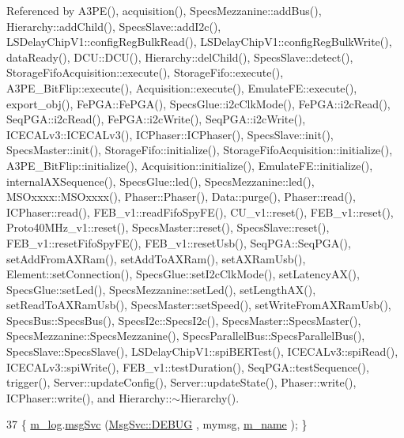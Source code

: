 Referenced by A3\+P\+E(), acquisition(), Specs\+Mezzanine\+::add\+Bus(), Hierarchy\+::add\+Child(), Specs\+Slave\+::add\+I2c(), L\+S\+Delay\+Chip\+V1\+::config\+Reg\+Bulk\+Read(), L\+S\+Delay\+Chip\+V1\+::config\+Reg\+Bulk\+Write(), data\+Ready(), D\+C\+U\+::\+D\+C\+U(), Hierarchy\+::del\+Child(), Specs\+Slave\+::detect(), Storage\+Fifo\+Acquisition\+::execute(), Storage\+Fifo\+::execute(), A3\+P\+E\+\_\+\+Bit\+Flip\+::execute(), Acquisition\+::execute(), Emulate\+F\+E\+::execute(), export\+\_\+obj(), Fe\+P\+G\+A\+::\+Fe\+P\+G\+A(), Specs\+Glue\+::i2c\+Clk\+Mode(), Fe\+P\+G\+A\+::i2c\+Read(), Seq\+P\+G\+A\+::i2c\+Read(), Fe\+P\+G\+A\+::i2c\+Write(), Seq\+P\+G\+A\+::i2c\+Write(), I\+C\+E\+C\+A\+Lv3\+::\+I\+C\+E\+C\+A\+Lv3(), I\+C\+Phaser\+::\+I\+C\+Phaser(), Specs\+Slave\+::init(), Specs\+Master\+::init(), Storage\+Fifo\+::initialize(), Storage\+Fifo\+Acquisition\+::initialize(), A3\+P\+E\+\_\+\+Bit\+Flip\+::initialize(), Acquisition\+::initialize(), Emulate\+F\+E\+::initialize(), internal\+A\+X\+Sequence(), Specs\+Glue\+::led(), Specs\+Mezzanine\+::led(), M\+S\+Oxxxx\+::\+M\+S\+Oxxxx(), Phaser\+::\+Phaser(), Data\+::purge(), Phaser\+::read(), I\+C\+Phaser\+::read(), F\+E\+B\+\_\+v1\+::read\+Fifo\+Spy\+F\+E(), C\+U\+\_\+v1\+::reset(), F\+E\+B\+\_\+v1\+::reset(), Proto40\+M\+Hz\+\_\+v1\+::reset(), Specs\+Master\+::reset(), Specs\+Slave\+::reset(), F\+E\+B\+\_\+v1\+::reset\+Fifo\+Spy\+F\+E(), F\+E\+B\+\_\+v1\+::reset\+Usb(), Seq\+P\+G\+A\+::\+Seq\+P\+G\+A(), set\+Add\+From\+A\+X\+Ram(), set\+Add\+To\+A\+X\+Ram(), set\+A\+X\+Ram\+Usb(), Element\+::set\+Connection(), Specs\+Glue\+::set\+I2c\+Clk\+Mode(), set\+Latency\+A\+X(), Specs\+Glue\+::set\+Led(), Specs\+Mezzanine\+::set\+Led(), set\+Length\+A\+X(), set\+Read\+To\+A\+X\+Ram\+Usb(), Specs\+Master\+::set\+Speed(), set\+Write\+From\+A\+X\+Ram\+Usb(), Specs\+Bus\+::\+Specs\+Bus(), Specs\+I2c\+::\+Specs\+I2c(), Specs\+Master\+::\+Specs\+Master(), Specs\+Mezzanine\+::\+Specs\+Mezzanine(), Specs\+Parallel\+Bus\+::\+Specs\+Parallel\+Bus(), Specs\+Slave\+::\+Specs\+Slave(), L\+S\+Delay\+Chip\+V1\+::spi\+B\+E\+R\+Test(), I\+C\+E\+C\+A\+Lv3\+::spi\+Read(), I\+C\+E\+C\+A\+Lv3\+::spi\+Write(), F\+E\+B\+\_\+v1\+::test\+Duration(), Seq\+P\+G\+A\+::test\+Sequence(), trigger(), Server\+::update\+Config(), Server\+::update\+State(), Phaser\+::write(), I\+C\+Phaser\+::write(), and Hierarchy\+::$\sim$\+Hierarchy().


\begin{DoxyCode}
37 \{ \hyperlink{classObject_a0d269813dd7ac1f24bc143031e2963f2}{m\_log}.\hyperlink{classMsgSvc_ad25f18047920cc59a314e5098259711c}{msgSvc} (\hyperlink{classMsgSvc_ae671eb7301996cd049d2da8a65925926a1dbdcc82dce88370ec335883c83b38b0}{MsgSvc::DEBUG}   , mymsg, \hyperlink{classObject_a8b83c95c705d2c3ba0d081fe1710f48d}{m\_name} ); \}
\end{DoxyCode}
\mbox{\label{classObject_a6c9a0397ca804e04d675ed05683f5420}} 
